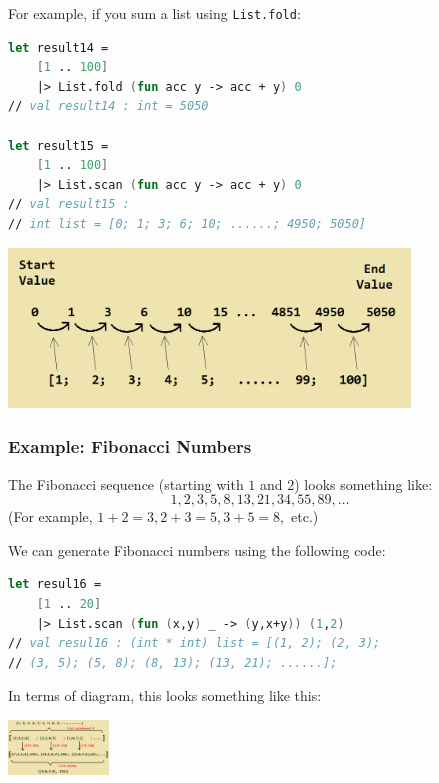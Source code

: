 \documentclass[12pt]{article}
\begin{document}
For example, if you sum a list using \texttt{List.fold}:
\begin{lstlisting}[language=FSharp]
let result14 = 
    [1 .. 100]
    |> List.fold (fun acc y -> acc + y) 0
// val result14 : int = 5050

let result15 = 
    [1 .. 100]
    |> List.scan (fun acc y -> acc + y) 0
// val result15 : 
// int list = [0; 1; 3; 6; 10; ......; 4950; 5050]
\end{lstlisting}
\begin{center}
\includegraphics[width=0.8\textwidth]{pictures/picture34.png}
\end{center}

\pagebreak
\subsubsection*{Example: Fibonacci Numbers}
The Fibonacci sequence (starting with $1$ and $2$) looks something like:
\[
1, 2, 3, 5, 8, 13, 21, 34, 55, 89, \ldots
\]
(For example, $1 + 2 = 3, 2 + 3 = 5, 3 + 5 = 8,$ etc.) 

We can generate Fibonacci numbers using the following code:
\begin{lstlisting}[language=FSharp]
let resul16 =
    [1 .. 20]
    |> List.scan (fun (x,y) _ -> (y,x+y)) (1,2)
// val resul16 : (int * int) list = [(1, 2); (2, 3); 
// (3, 5); (5, 8); (8, 13); (13, 21); ......];
\end{lstlisting}
In terms of diagram, this looks something like this:
\begin{center}
\includegraphics[width=0.2\textwidth]{pictures/picture35.png}
\end{center}

\pagebreak
\end{document}
